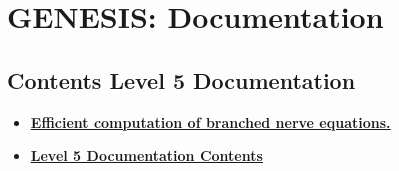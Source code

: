 \documentclass[12pt]{article}
\begin{document}
\section*{GENESIS: Documentation}

\subsection*{Contents Level 5 Documentation}

\begin{itemize}

\item \href{../effic84/effic84.pdf}{\bf \underline{Efficient computation of branched nerve equations.}}

\item \href{../contents-level5/contents-level5.pdf}{\bf \underline{Level 5 Documentation Contents}}


\end{itemize}

\end{document}
